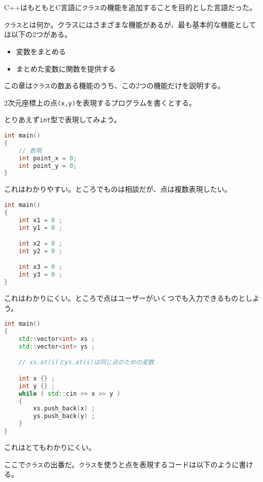 
C++はもともとC言語に\texttt{クラス}の機能を追加することを目的とした言語だった。

\texttt{クラス}とは何か。クラスにはさまざまな機能があるが、最も基本的な機能としては以下の2つがある。

\begin{itemize}
\item
  変数をまとめる
\item
  まとめた変数に関数を提供する
\end{itemize}

この章は\texttt{クラス}の数ある機能のうち、この2つの機能だけを説明する。


2次元座標上の点\texttt{(x,y)}を表現するプログラムを書くとする。

とりあえず\texttt{int}型で表現してみよう。

\begin{lstlisting}[language={C++}]
int main()
{
    // 表現
    int point_x = 0;
    int point_y = 0;
}
\end{lstlisting}

これはわかりやすい。ところでものは相談だが、点は複数表現したい。

\ifTombow\pagebreak\fi
\begin{lstlisting}[language={C++}]
int main()
{
    int x1 = 0 ;
    int y1 = 0 ;

    int x2 = 0 ;
    int y2 = 0 ;

    int x3 = 0 ;
    int y3 = 0 ;
}
\end{lstlisting}

これはわかりにくい。ところで点はユーザーがいくつでも入力できるものとしよう。

\begin{lstlisting}[language={C++}]
int main()
{
    std::vector<int> xs ;
    std::vector<int> ys ;

    // xs.at(i)とys.at(i)は同じ点のための変数

    int x {} ;
    int y {} ;
    while ( std::cin >> x >> y )
    {
        xs.push_back(x) ;
        ys.push_back(y) ;
    }
}
\end{lstlisting}

これはとてもわかりにくい。

ここで\texttt{クラス}の出番だ。\texttt{クラス}を使うと点を表現するコードは以下のように書ける。

